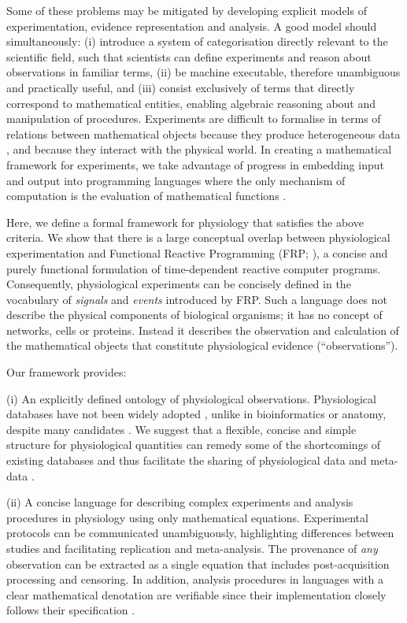 Some of these problems may be mitigated by developing explicit models
of experimentation, evidence representation and analysis. A good model
should simultaneously: (i) introduce a system of categorisation
directly relevant to the scientific field, such that scientists can
define experiments and reason about observations in familiar terms,
(ii) be machine executable, therefore unambiguous and practically
useful, and (iii) consist exclusively of terms that directly
correspond to mathematical entities, enabling algebraic reasoning
about and manipulation of procedures.  Experiments are difficult to
formalise in terms of relations between mathematical objects because
they produce heterogeneous data \citep{Tukey1962}, and because they
interact with the physical world. In creating a mathematical framework
for experiments, we take advantage of progress in embedding input and
output \citep{PeytonJones2002, Wadler1995} into programming languages
where the only mechanism of computation is the evaluation of
mathematical functions \citep{Church1941}.

Here, we define a formal framework for physiology
that satisfies the above criteria. We show that there
is a large conceptual overlap between physiological experimentation
and Functional Reactive Programming (FRP; \citep{Elliott1997,
  Nilsson2002}), a concise and purely functional formulation of
time-dependent reactive computer programs. Consequently, physiological
experiments can be concisely defined in the vocabulary of
\emph{signals} and \emph{events} introduced by FRP. Such a language
does not describe the physical components of biological organisms; it
has no concept of networks, cells or proteins. Instead it describes
the observation and calculation of the mathematical objects that
constitute physiological evidence (``observations'').

Our framework provides:

(i) An explicitly defined ontology of physiological
observations. Physiological databases have not been widely adopted
\citep{Herz2008, Amari2002}, unlike in bioinformatics or anatomy,
despite many candidates \citep{Jessop2010, Teeters2008, Frishkoff2009,
  Katz2010}.  We suggest that a flexible, concise and simple structure
for physiological quantities can remedy some of the shortcomings
\citep{Gardner2005, Amari2002} of existing databases and thus
facilitate the sharing of physiological data and meta-data
\citep{Insel2003}.

(ii) A concise language for describing complex experiments and
analysis procedures in physiology using only mathematical
equations. Experimental protocols can be communicated unambiguously,
highlighting differences between studies and facilitating replication
and meta-analysis. The provenance \citep{Pool2002,MacKenzie-Graham2008,
  VanHorn2009} of \emph{any} observation can be extracted as a single
equation that includes post-acquisition processing and censoring. In
addition, analysis procedures in languages with a clear mathematical
denotation are verifiable since their implementation closely
follows their specification \citep{Bird1996}.

